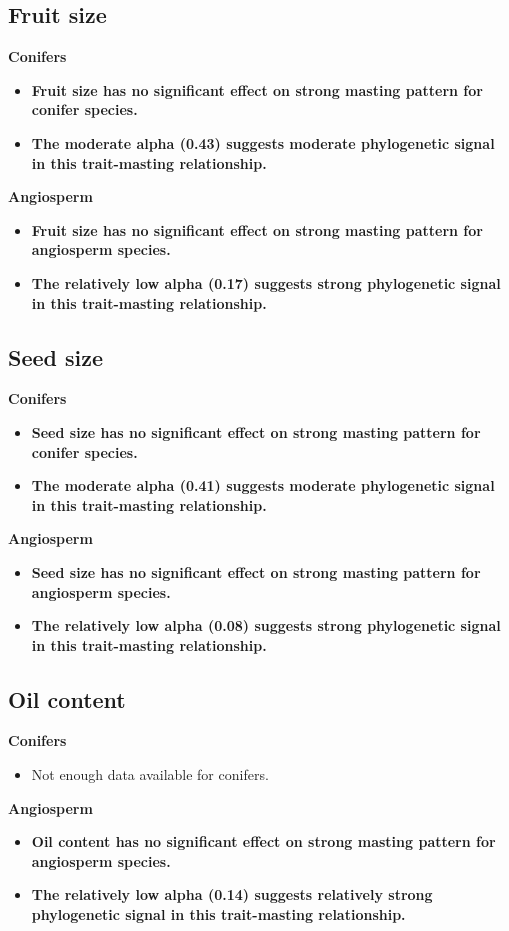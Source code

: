 \documentclass{article}
\begin{document}
\subsection{Fruit size}
\textbf{Conifers}\\
\begin{itemize}
\item \textbf{Fruit size has no significant effect on strong masting pattern for conifer species.}
\item \textbf{The moderate alpha (0.43) suggests moderate phylogenetic signal in this trait-masting relationship.}
\end{itemize}
\textbf{Angiosperm}\\
\begin{itemize}
\item \textbf{Fruit size has no significant effect on strong masting pattern for angiosperm species.}
\item \textbf{The relatively low alpha (0.17) suggests strong phylogenetic signal in this trait-masting relationship.}
\end{itemize}
\subsection{Seed size}
\textbf{Conifers}\\
\begin{itemize}
\item \textbf{Seed size has no significant effect on strong masting pattern for conifer species.}
\item \textbf{The moderate alpha (0.41) suggests moderate phylogenetic signal in this trait-masting relationship.}
\end{itemize}
\textbf{Angiosperm}\\
\begin{itemize}
\item \textbf{Seed size has no significant effect on strong masting pattern for angiosperm species.}
\item \textbf{The relatively low alpha (0.08) suggests strong phylogenetic signal in this trait-masting relationship.}
\end{itemize}
\subsection{Oil content}
\textbf{Conifers}\\
\begin{itemize}
\item Not enough data available for conifers.
\end{itemize}
\textbf{Angiosperm}\\
\begin{itemize}
\item \textbf{Oil content has no significant effect on strong masting pattern for angiosperm species.}
\item \textbf{The relatively low alpha (0.14) suggests relatively strong phylogenetic signal in this trait-masting relationship.}
\end{itemize}
\end{document}
